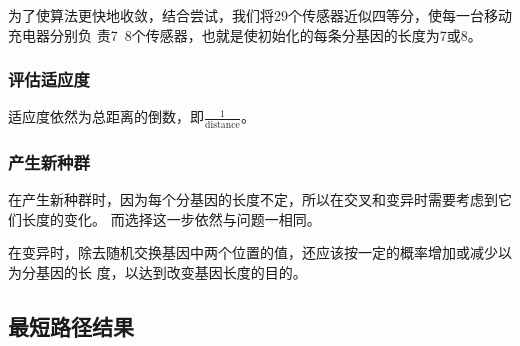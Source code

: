 \documentclass{ctexart}
\begin{document}
    为了使算法更快地收敛，结合尝试，我们将29个传感器近似四等分，使每一台移动充电器分别负
    责7~8个传感器，也就是使初始化的每条分基因的长度为7或8。
    \subsubsection{评估适应度}
    适应度依然为总距离的倒数，即$\frac{1}{\mbox{distance}}$。
    \subsubsection{产生新种群}
    在产生新种群时，因为每个分基因的长度不定，所以在交叉和变异时需要考虑到它们长度的变化。
    而选择这一步依然与问题一相同。

    在变异时，除去随机交换基因中两个位置的值，还应该按一定的概率增加或减少以为分基因的长
    度，以达到改变基因长度的目的。

    \subsection{最短路径结果}
\end{document}
